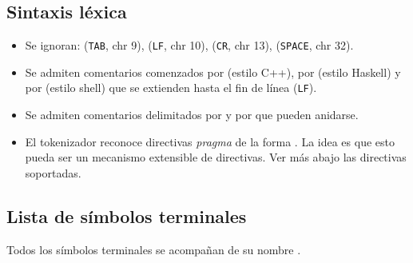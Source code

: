 \documentclass{article}
\begin{document}
\subsection{Sintaxis l\'exica}

\begin{itemize}
\item Se ignoran:
 (\texttt{TAB}, chr 9),
 (\texttt{LF}, chr 10),
 (\texttt{CR}, chr 13),
\chr{\,} (\texttt{SPACE}, chr 32).
\item Se admiten comentarios comenzados por \str{//} (estilo C++), por \str{--} (estilo Haskell) y por \str{\#} (estilo shell) que se extienden hasta el fin de l\'inea (\texttt{LF}).
\item Se admiten comentarios delimitados por \str{/*} \str{*/} y por \str{\{-} \str{-\}} que pueden anidarse.
\item El tokenizador reconoce directivas {\em pragma} de la forma . La idea es que esto pueda ser un mecanismo extensible de directivas. Ver m\'as abajo las directivas soportadas.
\end{itemize}

\subsection{Lista de s\'imbolos terminales}

Todos los s\'imbolos terminales se acompa\~nan de su nombre .\bigskip
\end{document}
